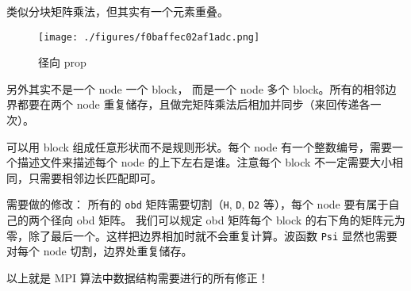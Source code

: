 
类似分块矩阵乘法，但其实有一个元素重叠。
\begin{figure}[ht]
\centering
\texttt{[image: ./figures/f0baffec02af1adc.png]}
\caption{径向 prop} \label{fig_HeMPI_1}
\end{figure}
另外其实不是一个 node 一个 block， 而是一个 node 多个 block。所有的相邻边界都要在两个 node 重复储存，且做完矩阵乘法后相加并同步（来回传递各一次）。

可以用 block 组成任意形状而不是规则形状。每个 node 有一个整数编号，需要一个描述文件来描述每个 node 的上下左右是谁。注意每个 block 不一定需要大小相同，只需要相邻边长匹配即可。

需要做的修改： 所有的 \verb`obd` 矩阵需要切割（\verb`H`, \verb`D`, \verb`D2` 等），每个 node 要有属于自己的两个径向 obd 矩阵。 我们可以规定 obd 矩阵每个 block 的右下角的矩阵元为零，除了最后一个。这样把边界相加时就不会重复计算。波函数 \verb`Psi` 显然也需要对每个 node 切割，边界处重复储存。

以上就是 MPI 算法中数据结构需要进行的所有修正！
